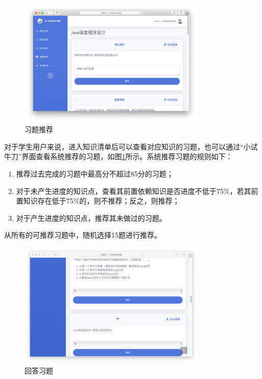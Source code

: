 \documentclass{nwafucoursepaper}
\begin{document}
\begin{figure}[htp]
  \centering
  \includegraphics[width=0.8\textwidth]{recommend_exercise.png}
  \caption{习题推荐}
  \label{recommend_exercise}
\end{figure}

对于学生用户来说，进入知识清单后可以查看对应知识的习题，也可以通过“小试牛刀”界面查看系统推荐的习题，如图\ref{recommend_exercise}所示。系统推荐习题的规则如下：
\begin{enumerate}
  \item 推荐过去完成的习题中最高分不超过85分的习题；
  \item 对于未产生进度的知识点，查看其前置依赖知识是否进度不低于75\%，若其前置知识存在低于75\%的，则不推荐；反之，则推荐；
  \item 对于产生进度的知识点，推荐其未做过的习题。
\end{enumerate}
从所有的可推荐习题中，随机选择15题进行推荐。

\begin{figure}[htp]
  \centering
  \includegraphics[width=0.8\textwidth]{answer_exercise.png}
  \caption{回答习题}
  \label{answer_exercise}
\end{figure}
\end{document}
